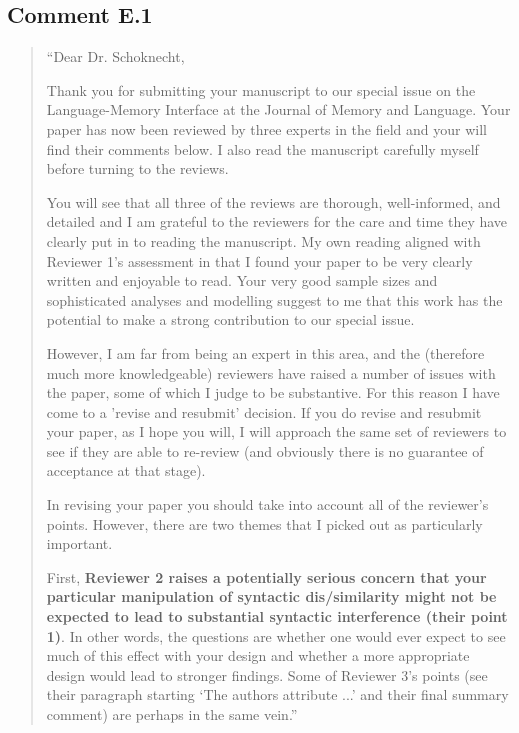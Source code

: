 \documentclass[12pt]{article}
\begin{document}
\subsection*{Comment E.1}
\begin{quote}
``Dear Dr. Schoknecht,

Thank you for submitting your manuscript to our special issue on the Language-Memory Interface at the Journal of Memory and Language. Your paper has now been reviewed by three experts in the field and your will find their comments below. I also read the manuscript carefully myself before turning to the reviews.

You will see that all three of the reviews are thorough, well-informed, and detailed and I am grateful to the reviewers for the care and time they have clearly put in to reading the manuscript. My own reading aligned with Reviewer 1's assessment in that I found your paper to be very clearly written and enjoyable to read. Your very good sample sizes and sophisticated analyses and modelling suggest to me that this work has the potential to make a strong contribution to our special issue.

However, I am far from being an expert in this area, and the (therefore much more knowledgeable) reviewers have raised a number of issues with the paper, some of which I judge to be substantive. For this reason I have come to a 'revise and resubmit' decision. If you do revise and resubmit your paper, as I hope you will, I will approach the same set of reviewers to see if they are able to re-review (and obviously there is no guarantee of acceptance at that stage).

In revising your paper you should take into account all of the reviewer's points. However, there are two themes that I picked out as particularly important.

First, \textbf{Reviewer 2 raises a potentially serious concern that your particular manipulation of syntactic dis/similarity might not be expected to lead to substantial syntactic interference (their point 1)}. In other words, the questions are whether one would ever expect to see much of this effect with your design and whether a more appropriate design would lead to stronger findings. Some of Reviewer 3's points (see their paragraph starting `The authors attribute ...' and their final summary comment) are perhaps in the same vein.''
\end{quote}
\end{document}
